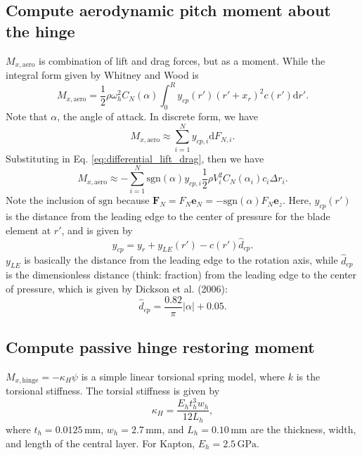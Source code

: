 \documentclass{article}
\newcommand{\D}{\mathrm{d}}
\begin{document}
\subsection{Compute aerodynamic pitch moment about the hinge}
\(M_{x,\mathrm{aero}}\) is combination of lift and drag forces, but as a moment. While the integral form given by Whitney and Wood is 
\begin{equation}
    M_{x,\mathrm{aero}} = \frac{1}{2} \rho \omega_h^2 C_N(\alpha) \int_0^R y_{cp}(r') (r' + x_r)^2 c(r') \D r'. 
\end{equation}
Note that \(\alpha\), the angle of attack. In discrete form, we have 
\begin{equation}
    M_{x,\mathrm{aero}} \approx \sum_{i=1}^{N} y_{cp,i} \D F_{N,i}. 
\end{equation}
Substituting in Eq. \ref{eq:differential_lift_drag}, then we have 
\begin{equation}
    M_{x,\mathrm{aero}} \approx -\sum_{i=1}^{N} \mathrm{sgn} (\alpha) y_{cp,i} \frac{1}{2} \rho V_i^2 C_N(\alpha_i) c_i \Delta r_i.
\end{equation}
Note the inclusion of \(\mathrm{sgn}\) because \(\textbf{F}_N = F_N \textbf{e}_N = -\mathrm{sgn}(\alpha) F_N \mathbf{e}_z\).
Here, \(y_{cp}(r')\) is the distance from the leading edge to the center of pressure for the blade element at \(r'\), and is given by 
\begin{equation}
    y_{cp} = y_r + y_{LE}(r') - c(r')\hat{d}_{cp}. 
\end{equation}
\(y_{LE}\) is basically the distance from the leading edge to the rotation axis, while \(\hat{d}_{cp}\) is the dimensionless distance (think: fraction) from the leading edge to the center of pressure, which is given by Dickson et al. (2006): 
\begin{equation}
    \hat{d}_{cp} = \frac{0.82}{\pi} |\alpha| + 0.05. 
\end{equation}

\subsection{Compute passive hinge restoring moment} 
\(M_{x, \mathrm{hinge}} = -\kappa_H \psi\) is a simple linear torsional spring model, where \(k\) is the torsional stiffness.
The torsial stiffness is given by 
\begin{equation}
    \kappa_H = \frac{E_h t_h^3 w_h}{12 L_h}, 
\end{equation}
where \(t_h = 0.0125\,\mathrm{mm}\), \(w_h = 2.7\,\mathrm{mm}\), and \(L_h = 0.10\,\mathrm{mm}\) are the thickness, width, and length of the central layer. For Kapton, \(E_h = 2.5\,\mathrm{GPa}\).
\end{document}
